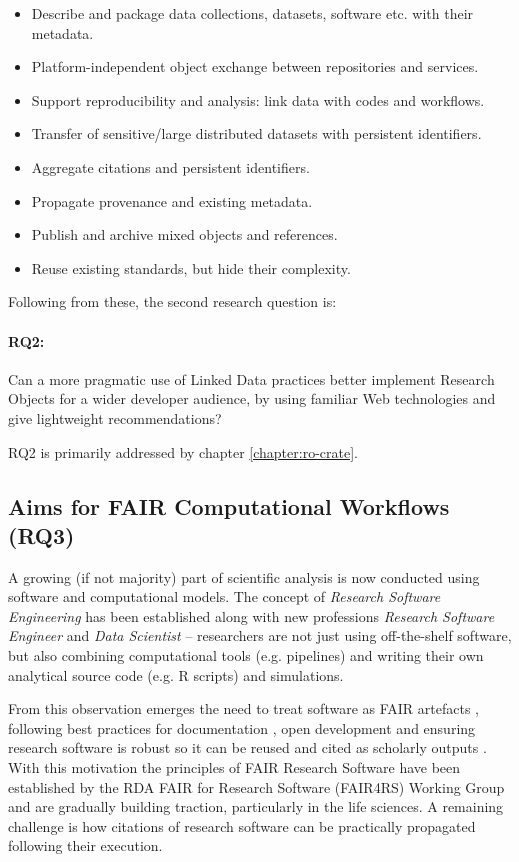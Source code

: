 \begin{itemize}
    \item Describe and package data collections, datasets, software etc. with their metadata.
    \item Platform-independent object exchange between repositories and services.
    \item Support reproducibility and analysis: link data with codes and workflows.
    \item Transfer of sensitive/large distributed datasets with persistent identifiers.
    \item Aggregate citations and persistent identifiers.
    \item Propagate provenance and existing metadata.
    \item Publish and archive mixed objects and references.
    \item Reuse existing standards, but hide their complexity.
\end{itemize}

Following from these, the second research question is: 

\paragraph{RQ2:}\label{rq2}  Can a more pragmatic use of Linked Data practices better implement Research Objects for a wider developer audience, by using familiar Web technologies and give lightweight recommendations?

RQ2 is primarily addressed by chapter \ref{chapter:ro-crate}.


\subsection{Aims for FAIR Computational Workflows (RQ3)}
\label{intro:rq3}

A growing (if not majority) part of scientific analysis is now conducted using software and computational models. The concept of \emph{Research Software Engineering} \cite{Cohen 2020} has been established along with new professions \emph{Research Software Engineer} \cite{Baxter 2012} and \emph{Data Scientist} \cite{van der Aalst 2014} -- researchers are not just using off-the-shelf software, but also combining computational tools (e.g. pipelines) and writing their own analytical source code (e.g. R scripts) and simulations.

From this observation emerges the need to treat software as FAIR artefacts \cite{Lamprecht 2019}, following best practices for documentation \cite{Lee 2018}, open development \cite{Prlić 2012} and ensuring research software is robust \cite{Taschuk 2017} so it can be reused and cited as scholarly outputs \cite{Smith 2016}. 
With this motivation the principles of FAIR Research Software \cite{Katz 2021b} have been established by the RDA FAIR for Research Software (FAIR4RS) Working Group \cite{Barker 2022} and are gradually building traction, particularly in the life sciences. A remaining challenge is how citations of research software can be practically propagated following their execution. 

